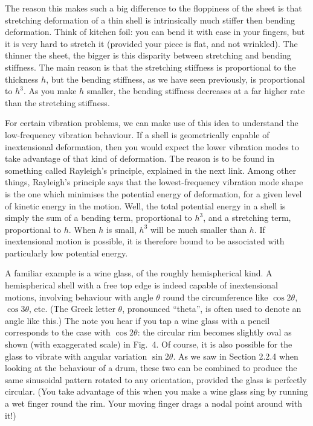   The reason this makes such a big difference to the floppiness of the sheet is 
  that stretching deformation of a thin shell is intrinsically much stiffer 
  then bending deformation. Think of kitchen foil: you can bend it with ease in 
  your fingers, but it is very hard to stretch it (provided your piece is flat, 
  and not wrinkled). The thinner the sheet, the bigger is this disparity 
  between stretching and bending stiffness. The main reason is that the 
  stretching stiffness is proportional to the thickness $h$, but the bending 
  stiffness, as we have seen previously, is proportional to $h^3$. As you make 
  $h$ smaller, the bending stiffness decreases at a far higher rate than the 
  stretching stiffness. 

  For certain vibration problems, we can make use of this idea to understand 
  the low-frequency vibration behaviour. If a shell is geometrically capable of 
  inextensional deformation, then you would expect the lower vibration modes to 
  take advantage of that kind of deformation. The reason is to be found in 
  something called Rayleigh's principle, explained in the next link. Among 
  other things, Rayleigh's principle says that the lowest-frequency vibration 
  mode shape is the one which minimises the potential energy of deformation, 
  for a given level of kinetic energy in the motion. Well, the total potential 
  energy in a shell is simply the sum of a bending term, proportional to $h^3$, 
  and a stretching term, proportional to $h$. When $h$ is small, $h^3$ will be 
  much smaller than $h$. If inextensional motion is possible, it is therefore 
  bound to be associated with particularly low potential energy. 

  A familiar example is a wine glass, of the roughly hemispherical kind. A 
  hemispherical shell with a free top edge is indeed capable of inextensional 
  motions, involving behaviour with angle $\theta$ round the circumference like 
  $\cos 2 \theta$, $\cos 3 \theta$, etc. (The Greek letter $\theta$, pronounced 
  ``theta'', is often used to denote an angle like this.) The note you hear if 
  you tap a wine glass with a pencil corresponds to the case with $\cos 2 
  \theta$: the circular rim becomes slightly oval as shown (with exaggerated 
  scale) in Fig.\ 4. Of course, it is also possible for the glass to vibrate 
  with angular variation $\sin 2 \theta$. As we saw in Section 2.2.4 when 
  looking at the behaviour of a drum, these two can be combined to produce the 
  same sinusoidal pattern rotated to any orientation, provided the glass is 
  perfectly circular. (You take advantage of this when you make a wine glass 
  sing by running a wet finger round the rim. Your moving finger drags a nodal 
  point around with it!) 

